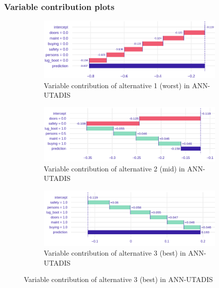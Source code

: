 \documentclass[../main.tex]{subfiles}
\begin{document}
\subsubsection{Variable contribution plots}
\begin{figure}[H]
    \centering
    \begin{subfigure}{\linewidth}
        \includegraphics[width=\linewidth]{../img/UTA-breakdown-worst.png}
        \caption{Variable contribution of alternative 1 (worst) in ANN-UTADIS}
        \label{fig:UTA-3alt1-contrib}
    \end{subfigure}
    \begin{subfigure}{\linewidth}
        \includegraphics[width=\linewidth]{../img/UTA-breakdown-mid.png}
        \caption{Variable contribution of alternative 2 (mid) in ANN-UTADIS}
        \label{fig:UTA-3alt2-contrib}
    \end{subfigure}
    \begin{subfigure}{\linewidth}
        \includegraphics[width=\linewidth]{../img/UTA-breakdown-best.png}
        \caption{Variable contribution of alternative 3 (best) in ANN-UTADIS}
        \label{fig:UTA-3alt3-contrib}
    \end{subfigure}
\end{figure}
\end{document}
